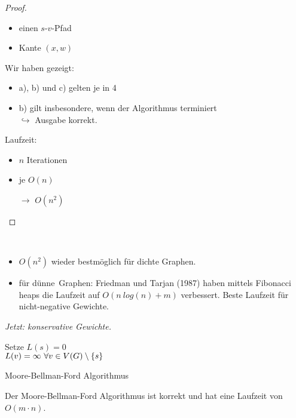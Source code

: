 \begin{proof}
	\begin{itemize}
		\item einen $s$-$v$-Pfad
		\item Kante $(x,w)$
	\end{itemize}
	Wir haben gezeigt:
	\begin{itemize}
		\item a), b) und c) gelten je in 4
		\item b) gilt insbesondere, wenn der Algorithmus terminiert\\
		$\hookrightarrow$ Ausgabe korrekt.
	\end{itemize}
	Laufzeit:
	\begin{itemize}
		\item $n$ Iterationen
		\item je $O(n)$
		\item[$\to$] $O(n^2)$
	\end{itemize}
\end{proof}
\begin{rem}~
	\begin{itemize}
		\item $O(n^2)$ wieder bestmöglich für dichte Graphen.
		\item für \dq dünne\dq~Graphen: Friedman und Tarjan (1987) haben mittels Fibonacci heaps die Laufzeit auf $O(n~log(n) + m)$ verbessert. Beste Laufzeit für nicht-negative Gewichte.
	\end{itemize}
\end{rem}
\textit{Jetzt: konservative Gewichte.}
\begin{algorithm}
	\vspace*{5pt}
	Setze $L(s) = 0$\\
	\hspace*{25pt}$L(v) = \infty~\forall v \in V(G)\setminus \{s\}$\\
	\caption{Moore-Bellman-Ford Algorithmus}
	\label{fig:Algorithmus}
\end{algorithm}
\begin{satz}
	Der Moore-Bellman-Ford Algorithmus ist korrekt und hat eine Laufzeit von $O(m\cdot n)$.
\end{satz}
